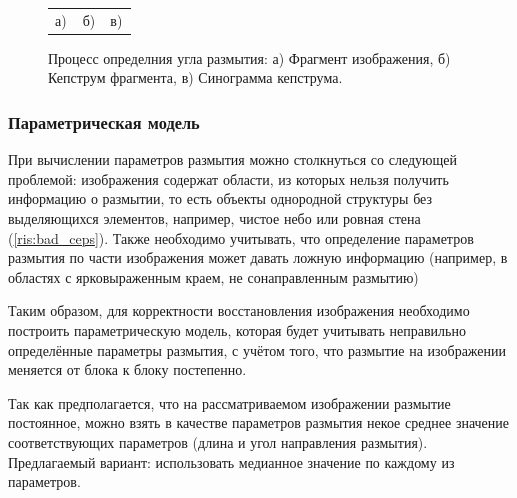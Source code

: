 \begin{figure}[H]
\begin{minipage}[h]{0.32\linewidth}
\end{minipage}
\begin{minipage}[h]{1\linewidth}
\begin{tabular}{p{0.32\linewidth}p{0.32\linewidth}p{0.32\linewidth}}
\centering а) & \centering б) & \centering в) \\
\end{tabular}
\end{minipage}
\vspace*{-1cm}
\caption{Процесс определния угла размытия: а) Фрагмент изображения, б) Кепструм фрагмента, в) Синограмма кепструма.}
\label{ris:correlationsignals}
\end{figure}

\subsubsection{Параметрическая модель}
При вычислении параметров размытия можно столкнуться со следующей проблемой: 
изображения содержат области, из которых нельзя получить информацию о размытии, 
то есть объекты однородной структуры без выделяющихся элементов, например, 
чистое небо или ровная стена (\ref{ris:bad_ceps}). Также необходимо учитывать, что определение параметров 
размытия по части изображения может давать ложную информацию (например, в областях с ярковыраженным  краем, не сонаправленным размытию)

Таким образом, для корректности восстановления изображения необходимо построить параметрическую модель, 
которая будет учитывать неправильно определённые параметры размытия, с учётом того, что размытие на изображении
меняется от блока к блоку постепенно.

Так как предполагается, что на рассматриваемом изображении размытие постоянное,
можно взять в качестве параметров размытия некое среднее значение соответствующих параметров
(длина и угол направления размытия). Предлагаемый вариант: использовать медианное значение по каждому из параметров.  


